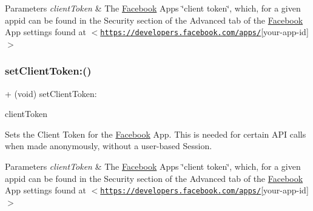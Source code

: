 \begin{DoxyParams}{Parameters}
{\em client\+Token} & The \hyperlink{interfaceFacebook}{Facebook} App\textquotesingle{}s \char`\"{}client token\char`\"{}, which, for a given appid can be found in the Security section of the Advanced tab of the \hyperlink{interfaceFacebook}{Facebook} App settings found at $<$\href{https://developers.facebook.com/apps/}{\tt https\+://developers.\+facebook.\+com/apps/}\mbox{[}your-\/app-\/id\mbox{]}$>$ \\
\hline
\end{DoxyParams}
\mbox{\label{interfaceFBSettings_a07cfc161668c190bf5fd37934821c4de}} 
\subsubsection{\texorpdfstring{set\+Client\+Token\+:()}{setClientToken:()}\hspace{0.1cm}{\footnotesize\ttfamily [3/5]}}
{\footnotesize\ttfamily + (void) set\+Client\+Token\+: \begin{DoxyParamCaption}\item[{(N\+S\+String $\ast$)}]{client\+Token }\end{DoxyParamCaption}}

Sets the Client Token for the \hyperlink{interfaceFacebook}{Facebook} App. This is needed for certain A\+PI calls when made anonymously, without a user-\/based Session.


\begin{DoxyParams}{Parameters}
{\em client\+Token} & The \hyperlink{interfaceFacebook}{Facebook} App\textquotesingle{}s \char`\"{}client token\char`\"{}, which, for a given appid can be found in the Security section of the Advanced tab of the \hyperlink{interfaceFacebook}{Facebook} App settings found at $<$\href{https://developers.facebook.com/apps/}{\tt https\+://developers.\+facebook.\+com/apps/}\mbox{[}your-\/app-\/id\mbox{]}$>$ \\
\hline
\end{DoxyParams}
\mbox{\label{interfaceFBSettings_a07cfc161668c190bf5fd37934821c4de}} 
